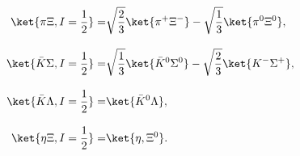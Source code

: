 $$%
\begin{align}
	\label{eq2ib1}
	\ket{\pi\Xi,I=\frac{1}{2}}=&\sqrt{\frac{2}{3}}\ket{\pi^{+}\Xi^{-}}-\sqrt{\frac{1}{3}}\ket{\pi^{0}\Xi^{0}},\\[2ex]
	\ket{\bar{K}\Sigma,I=\frac{1}{2}}=&\sqrt{\frac{1}{3}}\ket{\bar{K}^{0}\Sigma^{0}}-\sqrt{\frac{2}{3}}\ket{K^{-}\Sigma^{+}},\\[2ex]
	\ket{\bar{K}\Lambda,I=\frac{1}{2}}=&\ket{\bar{K}^{0}\Lambda},\\[2ex]
	\ket{\eta\Xi,I=\frac{1}{2}}=&\ket{\eta,\Xi^{0}}.
\end{align}
\newpage
